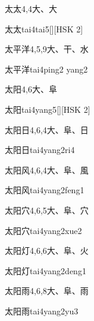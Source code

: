 \begin{entry}{太太}{4,4}{⼤、⼤}
  \begin{phonetics}{太太}{tai4tai5}[][HSK 2]
  \end{phonetics}
\end{entry}

\begin{entry}{太平洋}{4,5,9}{⼤、⼲、⽔}
  \begin{phonetics}{太平洋}{tai4ping2 yang2}
  \end{phonetics}
\end{entry}

\begin{entry}{太阳}{4,6}{⼤、⾩}
  \begin{phonetics}{太阳}{tai4yang5}[][HSK 2]
  \end{phonetics}
\end{entry}

\begin{entry}{太阳日}{4,6,4}{⼤、⾩、⽇}
  \begin{phonetics}{太阳日}{tai4yang2ri4}
  \end{phonetics}
\end{entry}

\begin{entry}{太阳风}{4,6,4}{⼤、⾩、⾵}
  \begin{phonetics}{太阳风}{tai4yang2feng1}
  \end{phonetics}
\end{entry}

\begin{entry}{太阳穴}{4,6,5}{⼤、⾩、⽳}
  \begin{phonetics}{太阳穴}{tai4yang2xue2}
  \end{phonetics}
\end{entry}

\begin{entry}{太阳灯}{4,6,6}{⼤、⾩、⽕}
  \begin{phonetics}{太阳灯}{tai4yang2deng1}
  \end{phonetics}
\end{entry}

\begin{entry}{太阳雨}{4,6,8}{⼤、⾩、⾬}
  \begin{phonetics}{太阳雨}{tai4yang2yu3}
  \end{phonetics}
\end{entry}

